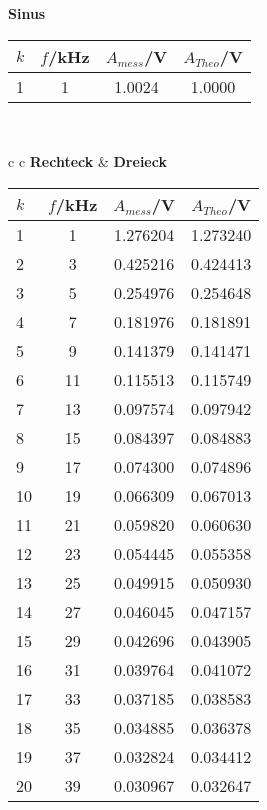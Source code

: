 \begin{center}
    \textbf{Sinus}\\[0,2cm]
    \begin{tabular}{l | c | c c}
        $k$ & $f$/kHz &   $A_{mess}$/V & $A_{Theo}$/V \\
        \hline
        1 & 1 &  1.0024 & 1.0000 \\
    \end{tabular}\\[0,5cm]
    \begin{tabular}{c c}
        \textbf{Rechteck} & \textbf{Dreieck} \\[0,2cm]
        \begin{tabular}{l | c | c c}
            $k$ & $f$/kHz  &   $A_{mess}$/V & $A_{Theo}$/V \\
            \hline
            1  &       1 &  1.276204 &  1.273240 \\
            2  &       3 &  0.425216 &  0.424413 \\
            3  &       5 &  0.254976 &  0.254648 \\
            4  &       7 &  0.181976 &  0.181891 \\
            5  &       9 &  0.141379 &  0.141471 \\
            6  &      11 &  0.115513 &  0.115749 \\
            7  &      13 &  0.097574 &  0.097942 \\
            8  &      15 &  0.084397 &  0.084883 \\
            9  &      17 &  0.074300 &  0.074896 \\
            10 &      19 &  0.066309 &  0.067013 \\
            11 &      21 &  0.059820 &  0.060630 \\
            12 &      23 &  0.054445 &  0.055358 \\
            13 &      25 &  0.049915 &  0.050930 \\
            14 &      27 &  0.046045 &  0.047157 \\
            15 &      29 &  0.042696 &  0.043905 \\
            16 &      31 &  0.039764 &  0.041072 \\
            17 &      33 &  0.037185 &  0.038583 \\
            18 &      35 &  0.034885 &  0.036378 \\
            19 &      37 &  0.032824 &  0.034412 \\
            20 &      39 &  0.030967 &  0.032647 \\

\end{tabular}
\end{tabular}
\end{center}
